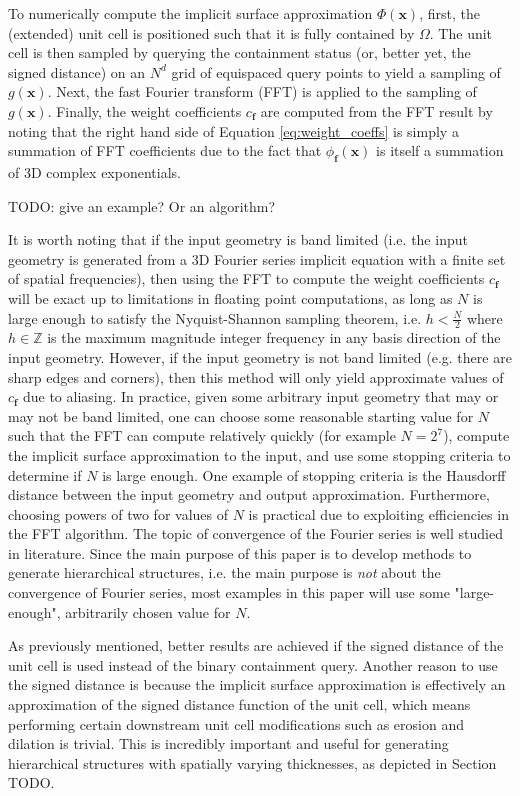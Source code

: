 \documentclass[acmtog]{acmart}
\begin{document}
To numerically compute the implicit surface approximation $\Phi(\mathbf{x})$, first, the (extended) unit cell is positioned such that it is fully contained by $\Omega$. The unit cell is then sampled by querying the containment status (or, better yet, the signed distance) on an $N^d$ grid of equispaced query points to yield a sampling of $g(\mathbf{x})$. Next, the fast Fourier transform (FFT) is applied to the sampling of $g(\mathbf{x})$. Finally, the weight coefficients $c_{\mathbf{f}}$ are computed from the FFT result by noting that the right hand side of Equation \ref{eq:weight_coeffs} is simply a summation of FFT coefficients due to the fact that $\phi_{\mathbf{f}}(\mathbf{x})$ is itself a summation of 3D complex exponentials.

TODO: give an example? Or an algorithm?

It is worth noting that if the input geometry is band limited (i.e. the input geometry is generated from a 3D Fourier series implicit equation with a finite set of spatial frequencies), then using the FFT to compute the weight coefficients $c_{\mathbf{f}}$ will be exact up to limitations in floating point computations, as long as $N$ is large enough to satisfy the Nyquist-Shannon sampling theorem, i.e. $h < \frac{N}{2}$ where $h \in \mathbb{Z}$ is the maximum magnitude integer frequency in any basis direction of the input geometry. However, if the input geometry is not band limited (e.g. there are sharp edges and corners), then this method will only yield approximate values of $c_{\mathbf{f}}$ due to aliasing. In practice, given some arbitrary input geometry that may or may not be band limited, one can choose some reasonable starting value for $N$ such that the FFT can compute relatively quickly (for example $N = 2^7$), compute the implicit surface approximation to the input, and use some stopping criteria to determine if $N$ is large enough. One example of stopping criteria is the Hausdorff distance between the input geometry and output approximation. Furthermore, choosing powers of two for values of $N$ is practical due to exploiting efficiencies in the FFT algorithm. The topic of convergence of the Fourier series is well studied in literature. Since the main purpose of this paper is to develop methods to generate hierarchical structures, i.e. the main purpose is \textit{not} about the convergence of Fourier series, most examples in this paper will use some "large-enough", arbitrarily chosen value for $N$.

As previously mentioned, better results are achieved if the signed distance of the unit cell is used instead of the binary containment query. Another reason to use the signed distance is because the implicit surface approximation is effectively an approximation of the signed distance function of the unit cell, which means performing certain downstream unit cell modifications such as erosion and dilation is trivial. This is incredibly important and useful for generating hierarchical structures with spatially varying thicknesses, as depicted in Section TODO.
\end{document}
